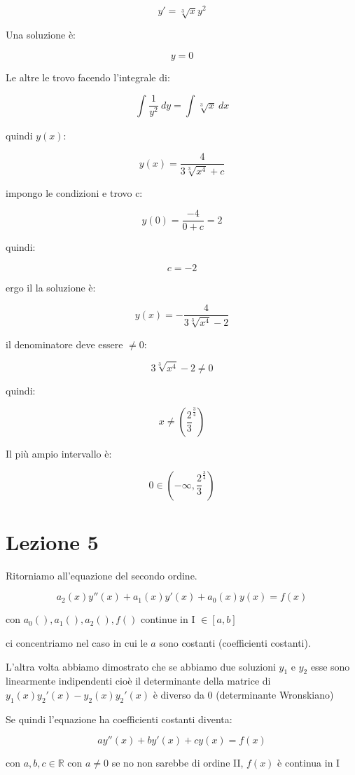 \documentclass[11pt]{article}
\begin{document}
\[
    y'=\sqrt[3]{x}y^{2}
\]

Una soluzione è:

\[
    y=0
\]

Le altre le trovo facendo l'integrale di:

\[
    \int_{}^{} { \frac{1}{y^{2}}} \: dy = \int_{}^{} {\sqrt[3]{x}} \: dx  
\]

quindi $y(x)$:

\[
    y(x)  = \frac{4}{3 \sqrt[3]{x^{4}}+c}
\]

impongo le condizioni e trovo c:

\[
    y(0) = \frac{-4}{0+c} = 2
\]

quindi:

\[
    c = -2
\]

ergo il la soluzione è:

\[
    y(x) = -\frac{4}{3 \sqrt[3]{x^{4}} - 2}
\]

il denominatore deve essere $\neq 0$:

\[
3 \sqrt[3]{x^{4}} - 2 \neq 0
\]

quindi:

\[
    x \neq (\frac{2}{3}^{ \frac{3}{4}})
\]

Il più ampio intervallo è:

\[
    0 \in (-\infty, \frac{2}{3}^{ \frac{3}{4}}) 
\]

\newpage

\section{Lezione 5}

Ritorniamo all'equazione del secondo ordine.

\[
    a_2(x)y''(x) + a_1(x) y'(x) + a_0(x) y(x) = f(x)
\]

con $a_0(),a_1(),a_2(),f()$ continue in I $ \in  [a,b]$

ci concentriamo nel caso in cui le $a$ sono costanti (coefficienti costanti).

L'altra volta abbiamo dimostrato che se abbiamo due soluzioni $y_1$ e $y_2$ esse sono linearmente indipendenti cioè il determinante della matrice di $y_1(x)y_2'(x)-y_2(x)y_2'(x)$ è diverso da 0 (determinante Wronskiano)

Se quindi l'equazione ha coefficienti costanti diventa:

\[
    ay''(x)+by'(x)+cy(x) = f(x)
\]

con $a,b,c \in \mathbb{R}$ con $a \neq 0$ se no non sarebbe di ordine II, $f(x)$ è continua in I
\end{document}
